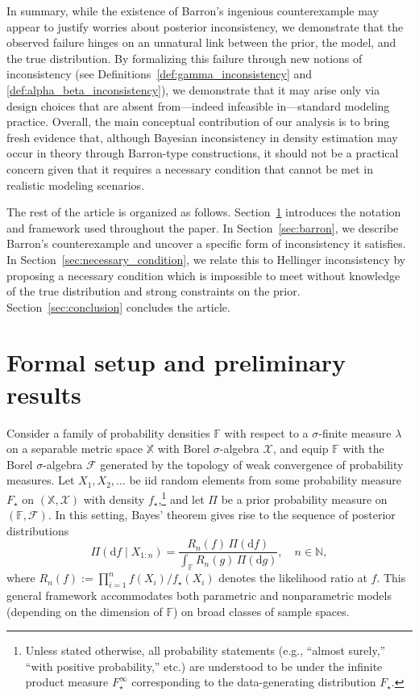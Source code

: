 \documentclass[11pt,twoside]{article}
\def\NN{\mathbb{N}}
\def\FF{\mathbb{F}}
\def\XX{\mathbb{X}}
\def\FF{\mathbb{F}}
\begin{document}
In summary, while the existence of Barron’s ingenious counterexample may appear to justify worries about posterior inconsistency, we demonstrate that the observed failure hinges on an unnatural link between the prior, the model, and the true distribution. By formalizing this failure through new notions of inconsistency (see Definitions~\ref{def:gamma_inconsistency} and \ref{def:alpha_beta_inconsistency}), we demonstrate that it may arise only via design choices that are absent from---indeed infeasible in---standard modeling practice. Overall, the main conceptual contribution of our analysis is to bring fresh evidence that, although Bayesian inconsistency in density estimation may occur in theory through Barron-type constructions, it should not be a practical concern given that it requires a necessary condition that cannot be met in realistic modeling scenarios.



The rest of the article is organized as follows. Section~\ref{sec:notation} introduces the notation and framework used throughout the paper. In Section~\ref{sec:barron}, we describe Barron’s counterexample and uncover a specific form of inconsistency it satisfies. In Section~\ref{sec:necessary_condition}, we relate this to Hellinger inconsistency by proposing a necessary condition which is impossible to meet without knowledge of the true distribution and strong constraints on the prior. Section~\ref{sec:conclusion} concludes the article.





\section{Formal setup and preliminary results}\label{sec:notation}

Consider a family of probability densities $\FF$ with respect to a $\sigma$-finite measure $\lambda$ on a separable metric space $\XX$ with Borel $\sigma$-algebra $\mathscr X$, and equip $\FF$ with the Borel $\sigma$-algebra $\mathscr F$ generated by the topology of weak convergence of probability measures. Let $X_1, X_2, \dots$ be iid random elements from some probability measure $F_\star$ on $(\XX, \mathscr X)$ with density $f_\star$,\footnote{Unless stated otherwise, all probability statements (e.g., “almost surely,” “with positive probability,” etc.) are understood to be under the infinite product measure $F_\star^\infty$ corresponding to the data-generating distribution $F_\star$.} and let $\Pi$ be a prior probability measure on $(\FF, \mathscr F)$. In this setting, Bayes' theorem gives rise to the sequence of posterior distributions
%
\begin{equation}\label{eq:def_posterior}
    \Pi(\mathrm df\mid  X_{1:n}) = \frac{R_n(f)\, \Pi(\mathrm df)}{\int_\FF R_n(g)\,\Pi(\mathrm dg)}, \quad n\in\NN,
\end{equation}
%
where $R_n(f):=\prod_{i=1}^n f(X_i)/f_\star(X_i)$ denotes the likelihood ratio at $f$. This general framework accommodates both parametric and nonparametric models (depending on the dimension of $\FF$) on broad classes of sample spaces.
\end{document}
